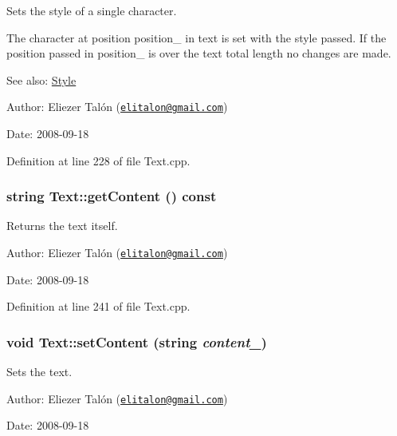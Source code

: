 Sets the style of a single character. 

The character at position position\_\- in text is set with the style passed. If the position passed in position\_\- is over the text total length no changes are made.

\begin{Desc}
\item[See also:]\hyperlink{class_style}{Style}\end{Desc}
\begin{Desc}
\item[Author:]Eliezer Talón (\href{mailto:elitalon@gmail.com}{\tt elitalon@gmail.com}) \end{Desc}
\begin{Desc}
\item[Date:]2008-09-18 \end{Desc}


Definition at line 228 of file Text.cpp.\hypertarget{class_text_b982578fcb4eda8f6cb49927600f859f}{
\subsubsection[getContent]{\setlength{\rightskip}{0pt plus 5cm}string Text::getContent () const}}
\label{class_text_b982578fcb4eda8f6cb49927600f859f}


Returns the text itself. 

\begin{Desc}
\item[Author:]Eliezer Talón (\href{mailto:elitalon@gmail.com}{\tt elitalon@gmail.com}) \end{Desc}
\begin{Desc}
\item[Date:]2008-09-18 \end{Desc}


Definition at line 241 of file Text.cpp.\hypertarget{class_text_c96c194afc22e2d11cbc547cde66fe3b}{
\subsubsection[setContent]{\setlength{\rightskip}{0pt plus 5cm}void Text::setContent (string {\em content\_\-})}}
\label{class_text_c96c194afc22e2d11cbc547cde66fe3b}


Sets the text. 

\begin{Desc}
\item[Author:]Eliezer Talón (\href{mailto:elitalon@gmail.com}{\tt elitalon@gmail.com}) \end{Desc}
\begin{Desc}
\item[Date:]2008-09-18 \end{Desc}


